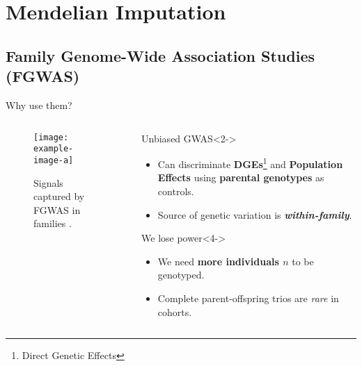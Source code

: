 \section{Mendelian Imputation}

\subsection{Family Genome-Wide Association Studies (FGWAS)}

\begin{frame}{Why use them?}
    \begin{columns}
        \begin{column}{0.45\textwidth}
            \begin{figure}
                \centering
                \texttt{[image: example-image-a]}
                \caption{Signals captured by FGWAS in families \parencite{young2019}.}
                \label{fig:fgwas-genetic-signals}
            \end{figure}
        \end{column}

        \begin{column}{0.45\textwidth}
            \begin{exampleblock}{Unbiased GWAS}<2->
                \begin{itemize}
                    \item<2-> Can discriminate \textbf{DGEs}\footnote{Direct Genetic Effects} and \textbf{Population Effects} using \textbf{parental genotypes} as controls.
                    \item<3-> Source of genetic variation is \textbf{\textit{within-family}}.
                \end{itemize}
            \end{exampleblock}

            \begin{alertblock}{We lose power}<4->
                \begin{itemize}
                    \item<4-> We need \textbf{more individuals $n$} to be genotyped.
                    \item<5-> Complete parent-offspring trios are \textit{rare} in cohorts.
                \end{itemize} 
            \end{alertblock}
        \end{column}
    \end{columns}
\end{frame}

